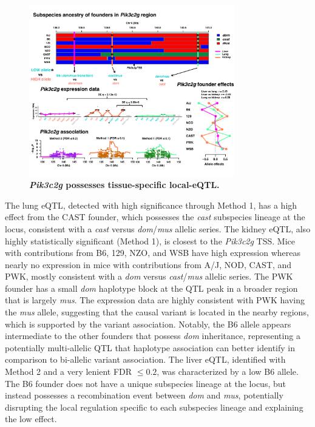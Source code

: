 \begin{figure}[h]
\renewcommand{\familydefault}{\sfdefault}\normalfont
\centering
\includegraphics[width=0.8\textwidth, trim={0in 0.5in 0in 0in}, clip]{figs/pik3c2g_example.pdf}
\caption{\textbf{\textit{Pik3c2g} possesses tissue-specific local-eQTL.}\label{fig:pik3c2g}}
\end{figure}

The lung eQTL, detected with high significance through Method 1, has a high effect from the CAST founder, which possesses the \textit{cast} subspecies lineage at the locus, consistent with a \textit{cast} versus \textit{dom}/\textit{mus} allelic series. The kidney eQTL, also highly statistically significant (Method 1), is closest to the \textit{Pik3c2g} TSS. Mice with contributions from B6, 129, NZO, and WSB have high expression whereas nearly no expression in mice with contributions from A/J, NOD, CAST, and PWK, mostly consistent with a \textit{dom} versus \textit{cast}/\textit{mus} allelic series. The PWK founder has a small \textit{dom} haplotype block at the QTL peak in a broader region that is largely \textit{mus}. The expression data are highly consistent with PWK having the \textit{mus} allele, suggesting that the causal variant is located in the nearby regions, which is supported by the variant association. Notably, the B6 allele appears intermediate to the other founders that possess \textit{dom} inheritance, representing a potentially multi-allelic QTL that haplotype association can better identify in comparison to bi-allelic variant association. The liver eQTL, identified with Method 2 and a very lenient FDR $\leq 0.2$, was characterized by a low B6 allele. The B6 founder does not have a unique subspecies lineage at the locus, but instead possesses a recombination event between \textit{dom} and \textit{mus}, potentially disrupting the local regulation specific to each subspecies lineage and explaining the low effect.

